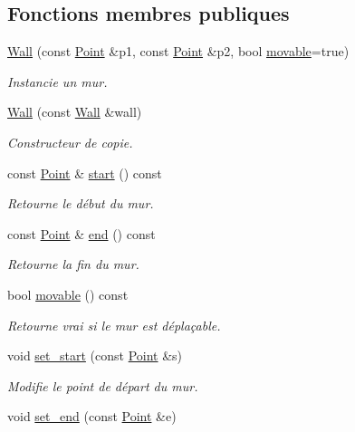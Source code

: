 \subsection*{Fonctions membres publiques}
\begin{DoxyCompactItemize}
\item 
\hyperlink{classWall_af8bbfd7bd810a0728769c7eed06ef38f}{Wall} (const \hyperlink{classPoint}{Point} \&p1, const \hyperlink{classPoint}{Point} \&p2, bool \hyperlink{classWall_a1f834d6f719d7b5ac4ae2428fef627e4}{movable}=true)
\begin{DoxyCompactList}\small\item\em Instancie un mur. \end{DoxyCompactList}\item 
\hyperlink{classWall_af9843adb784b97d73bdb74a7992bf825}{Wall} (const \hyperlink{classWall}{Wall} \&wall)
\begin{DoxyCompactList}\small\item\em Constructeur de copie. \end{DoxyCompactList}\item 
const \hyperlink{classPoint}{Point} \& \hyperlink{classWall_a0e3acb1aa5f837e1dc6b353a473bc9d4}{start} () const 
\begin{DoxyCompactList}\small\item\em Retourne le début du mur. \end{DoxyCompactList}\item 
const \hyperlink{classPoint}{Point} \& \hyperlink{classWall_ad8ab4f9a70757c77c70bc153e9a3bf1f}{end} () const 
\begin{DoxyCompactList}\small\item\em Retourne la fin du mur. \end{DoxyCompactList}\item 
bool \hyperlink{classWall_a1f834d6f719d7b5ac4ae2428fef627e4}{movable} () const 
\begin{DoxyCompactList}\small\item\em Retourne vrai si le mur est déplaçable. \end{DoxyCompactList}\item 
void \hyperlink{classWall_ad11150d7394e06447a697c4e79d47543}{set\+\_\+start} (const \hyperlink{classPoint}{Point} \&s)
\begin{DoxyCompactList}\small\item\em Modifie le point de départ du mur. \end{DoxyCompactList}\item 
void \hyperlink{classWall_a603f23dd306b50d9b2724f83beb61d62}{set\+\_\+end} (const \hyperlink{classPoint}{Point} \&e)

\end{DoxyCompactItemize}
